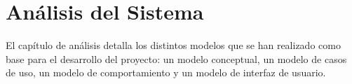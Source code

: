

\chapter{Análisis del Sistema}
\thispagestyle{chapterpage}

El capítulo de análisis detalla los distintos modelos que se han realizado 
como base para el desarrollo del proyecto: un modelo conceptual, un modelo
de casos de uso, un modelo de comportamiento y un modelo de interfaz de usuario. 







